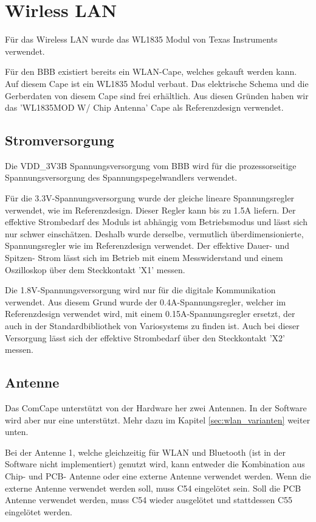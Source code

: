 \section{Wirless LAN}
Für das Wireless LAN wurde das WL1835 Modul von Texas Instruments verwendet.

Für den BBB existiert bereits ein WLAN-Cape, welches gekauft werden kann. Auf diesem Cape ist ein WL1835 Modul verbaut. Das elektrische Schema und die Gerberdaten von diesem Cape sind frei erhältlich\cite{boardZooWLANCape}. Aus diesen Gründen haben wir das 'WL1835MOD W/ Chip Antenna' Cape als Referenzdesign verwendet.



\subsection{Stromversorgung}
Die VDD\_3V3B Spannungsversorgung vom BBB wird für die prozessorseitige Spannungsversorgung des Spannungspegelwandlers verwendet.

Für die 3.3V-Spannungsversorgung wurde der gleiche lineare Spannungsregler verwendet, wie im Referenzdesign. Dieser Regler kann bis zu 1.5A liefern. Der effektive Strombedarf des Moduls ist abhängig vom Betriebsmodus und lässt sich nur schwer einschätzen. Deshalb wurde derselbe, vermutlich überdimensionierte, Spannungsregler wie im Referenzdesign verwendet. Der effektive Dauer- und Spitzen- Strom lässt sich im Betrieb mit einem Messwiderstand und einem Oszilloskop über dem Steckkontakt 'X1' messen.

Die 1.8V-Spannungsversorgung wird nur für die digitale Kommunikation verwendet. Aus diesem Grund wurde der 0.4A-Spannungsregler, welcher im Referenzdesign verwendet wird, mit einem 0.15A-Spannungsregler ersetzt, der auch in der Standardbibliothek von Variosystems zu finden ist. Auch bei dieser Versorgung lässt sich der effektive Strombedarf über den Steckkontakt 'X2' messen.

\subsection{Antenne}
Das ComCape unterstützt von der Hardware her zwei Antennen. In der Software wird aber nur eine unterstützt. Mehr dazu im Kapitel \ref{sec:wlan_varianten} weiter unten.

Bei der Antenne 1, welche gleichzeitig für WLAN und Bluetooth (ist in der Software nicht implementiert) genutzt wird, kann entweder die Kombination aus Chip- und PCB- Antenne oder eine externe Antenne verwendet werden. Wenn die externe Antenne verwendet werden soll, muss C54 eingelötet sein. Soll die PCB Antenne verwendet werden, muss C54 wieder ausgelötet und stattdessen C55 eingelötet werden.

